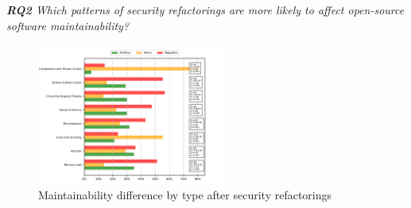 \documentclass[10pt,conference]{IEEEtran}
\begin{document}




\begin{framed}
\textit{\textbf{RQ2} Which patterns of security refactorings are more likely to affect open-source software maintainability?}
\end{framed}



\begin{figure}[h]
 	\centering
 	\includegraphics[width=0.55\textwidth]{figures/category.pdf}
 	\caption{Maintainability difference by type after security refactorings}
	\label{fig:pat}
\end{figure}
\end{document}
